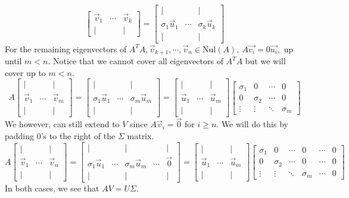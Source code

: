 \begin{enumerate}[resume]
{$$\begin{bmatrix}
    \vec{v}_{1} & \cdots & \vec{v}_{k}  \\ | & \ & | \end{bmatrix} 
    =  \begin{bmatrix} | & \ & | \\ \sigma_{1} \vec{u}_{1} & \cdots & \sigma_{k} \vec{u}_{k} \\ | & \ & | \end{bmatrix}$$
    For the remaining eigenvectors of $A^{T}A, \vec{v}_{k + 1}, \cdots, \vec{v}_{n} \in \text{Nul}(A), \ A \vec{v_{i}} = 0 \vec{u_{i}},$ up until $m < n.$ Notice that we cannot cover all eigenvectors of $A^{T} A$ but we will cover up to $m < n.$
    $$A \begin{bmatrix} | & \ & | \\
    \vec{v}_{1} & \cdots & \vec{v}_{m}  \\ | & \ & | \end{bmatrix} = 
    \begin{bmatrix} | & \ & | \\ \sigma_{1} \vec{u}_{1} & \cdots & \sigma_{m} \vec{u}_{m} \\ | & \ & | \end{bmatrix} = 
     \begin{bmatrix} | & \ & | \\ \vec{u}_{1} & \cdots & \vec{u}_{m} \\ | & \ & | \end{bmatrix} \begin{bmatrix} \sigma_{1} & 0 &  \cdots & 0 \\ 0 & \sigma_{2} & \cdots & 0 \\ \vdots & \vdots & \ddots & \sigma_{m} \end{bmatrix}$$
    We however, can still extend to $V$ since $A \vec{v}_{i} = \vec{0}$ for $i \geq n.$ We will do this by padding $0$'s to the right of the $\Sigma$ matrix.
    $$A \begin{bmatrix} | & \ & | \\
    \vec{v}_{1} & \cdots & \vec{v}_{n}  \\ | & \ & | \end{bmatrix} = 
    \begin{bmatrix} | & \ & | &  & | \\ \sigma_{1} \vec{u}_{1} & \cdots & \sigma_{m} \vec{u}_{m} & \cdots & \vec{0} \\ | & \ & | &  & | \end{bmatrix} = 
     \begin{bmatrix} | & \ & | \\ \vec{u}_{1} & \cdots & \vec{u}_{m} \\ | & \ & | \end{bmatrix} \begin{bmatrix} \sigma_{1} & 0 & \cdots & 0 & \cdots & 0 \\ 0 & \sigma_{2} & \cdots & 0 & \cdots & 0 \\ \vdots & \vdots & \ddots & \sigma_{m} & \cdots&  0 \end{bmatrix}$$
    In both cases, we see that $AV = U\Sigma .$
  }


\end{enumerate}

